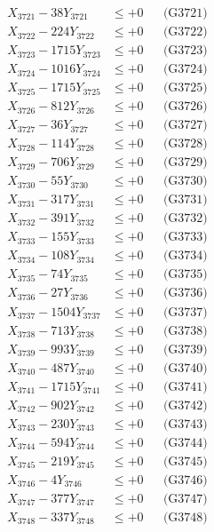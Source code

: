 \documentclass[a4paper,10pt]{article}
\begin{document}
{\begin{align}
\allowbreak
X_{3721} - 38Y_{3721} &\leq +0 && \text{(G3721)} \\
X_{3722} - 224Y_{3722} &\leq +0 && \text{(G3722)} \\
X_{3723} - 1715Y_{3723} &\leq +0 && \text{(G3723)} \\
X_{3724} - 1016Y_{3724} &\leq +0 && \text{(G3724)} \\
X_{3725} - 1715Y_{3725} &\leq +0 && \text{(G3725)} \\
X_{3726} - 812Y_{3726} &\leq +0 && \text{(G3726)} \\
X_{3727} - 36Y_{3727} &\leq +0 && \text{(G3727)} \\
X_{3728} - 114Y_{3728} &\leq +0 && \text{(G3728)} \\
X_{3729} - 706Y_{3729} &\leq +0 && \text{(G3729)} \\
X_{3730} - 55Y_{3730} &\leq +0 && \text{(G3730)} \\
\allowbreak
X_{3731} - 317Y_{3731} &\leq +0 && \text{(G3731)} \\
X_{3732} - 391Y_{3732} &\leq +0 && \text{(G3732)} \\
X_{3733} - 155Y_{3733} &\leq +0 && \text{(G3733)} \\
X_{3734} - 108Y_{3734} &\leq +0 && \text{(G3734)} \\
X_{3735} - 74Y_{3735} &\leq +0 && \text{(G3735)} \\
X_{3736} - 27Y_{3736} &\leq +0 && \text{(G3736)} \\
X_{3737} - 1504Y_{3737} &\leq +0 && \text{(G3737)} \\
X_{3738} - 713Y_{3738} &\leq +0 && \text{(G3738)} \\
X_{3739} - 993Y_{3739} &\leq +0 && \text{(G3739)} \\
X_{3740} - 487Y_{3740} &\leq +0 && \text{(G3740)} \\
\allowbreak
X_{3741} - 1715Y_{3741} &\leq +0 && \text{(G3741)} \\
X_{3742} - 902Y_{3742} &\leq +0 && \text{(G3742)} \\
X_{3743} - 230Y_{3743} &\leq +0 && \text{(G3743)} \\
X_{3744} - 594Y_{3744} &\leq +0 && \text{(G3744)} \\
X_{3745} - 219Y_{3745} &\leq +0 && \text{(G3745)} \\
X_{3746} - 4Y_{3746} &\leq +0 && \text{(G3746)} \\
X_{3747} - 377Y_{3747} &\leq +0 && \text{(G3747)} \\
X_{3748} - 337Y_{3748} &\leq +0 && \text{(G3748)} \\

\end{align}}
\end{document}

